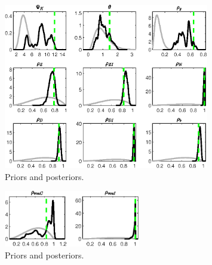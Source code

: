 \begin{figure}[H]
\centering
\includegraphics[width=0.80\textwidth]{BRS_sectoral/Output/BRS_sectoral_PriorsAndPosteriors3}
\caption{Priors and posteriors.}\label{Fig:PriorsAndPosteriors:3}
\end{figure}
 
\begin{figure}[H]
\centering
\includegraphics[width=0.53\textwidth]{BRS_sectoral/Output/BRS_sectoral_PriorsAndPosteriors4}
\caption{Priors and posteriors.}\label{Fig:PriorsAndPosteriors:4}
\end{figure}
 
